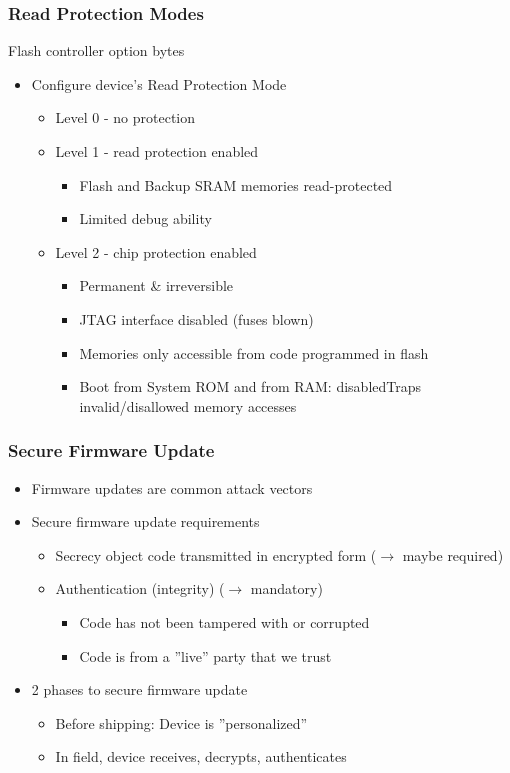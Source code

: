 \subsubsection{Read Protection Modes}
Flash controller option bytes
\begin{itemize}
  \item Configure device's Read Protection Mode
  \begin{itemize}
    \item Level 0 - no protection
    \item Level 1 - read protection enabled
    \begin{itemize}
      \item Flash and Backup SRAM memories read-protected
      \item Limited debug ability
    \end{itemize}
    \item Level 2 - chip protection enabled
    \begin{itemize}
      \item Permanent \& irreversible
      \item JTAG interface disabled (fuses blown)
      \item Memories only accessible from code programmed in flash
      \item Boot from System ROM and from RAM: disabledTraps invalid/disallowed memory accesses
    \end{itemize}
  \end{itemize}
\end{itemize}

\subsubsection{Secure Firmware Update}
\begin{itemize}
  \item Firmware updates are common attack vectors
  \item Secure firmware update requirements
  \begin{itemize}
    \item Secrecy {\textemdash} object code transmitted in encrypted form ($\rightarrow$ maybe required)
    \item Authentication (integrity) ($\rightarrow$ mandatory)
    \begin{itemize}
      \item Code has not been tampered with or corrupted
      \item Code is from a ''live'' party that we trust
    \end{itemize}
  \end{itemize}
  \item 2 phases to secure firmware update
  \begin{itemize}
    \item Before shipping: Device is ''personalized''
    \item In field, device receives, decrypts, authenticates
  \end{itemize}
\end{itemize}

